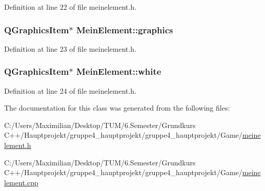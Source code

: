 Definition at line 22 of file meinelement.\+h.

\subsubsection[{\texorpdfstring{graphics}{graphics}}]{\setlength{\rightskip}{0pt plus 5cm}Q\+Graphics\+Item$\ast$ Mein\+Element\+::graphics}\hypertarget{class_mein_element_a6d0a318f2e37f3633f7cf6fc20e83531}{}\label{class_mein_element_a6d0a318f2e37f3633f7cf6fc20e83531}


Definition at line 23 of file meinelement.\+h.

\subsubsection[{\texorpdfstring{white}{white}}]{\setlength{\rightskip}{0pt plus 5cm}Q\+Graphics\+Item$\ast$ Mein\+Element\+::white}\hypertarget{class_mein_element_a4811ea6a6c50dfad16c39bbaa9a758b8}{}\label{class_mein_element_a4811ea6a6c50dfad16c39bbaa9a758b8}


Definition at line 24 of file meinelement.\+h.



The documentation for this class was generated from the following files\+:\begin{DoxyCompactItemize}
\item 
C\+:/\+Users/\+Maximilian/\+Desktop/\+T\+U\+M/6.\+Semester/\+Grundkurs C++/\+Hauptprojekt/gruppe4\+\_\+hauptprojekt/gruppe4\+\_\+hauptprojekt/\+Game/\hyperlink{meinelement_8h}{meinelement.\+h}\item 
C\+:/\+Users/\+Maximilian/\+Desktop/\+T\+U\+M/6.\+Semester/\+Grundkurs C++/\+Hauptprojekt/gruppe4\+\_\+hauptprojekt/gruppe4\+\_\+hauptprojekt/\+Game/\hyperlink{meinelement_8cpp}{meinelement.\+cpp}\end{DoxyCompactItemize}
